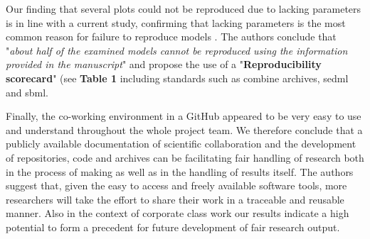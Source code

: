 Our finding that several plots could not be reproduced due to lacking parameters is in line with a current study, confirming that lacking parameters is the most common reason for failure to reproduce models \cite{tiwari2021reproducibility}. The authors conclude that "\textit{about half of the examined models cannot be reproduced using the information provided in the manuscript}" \cite{tiwari2021reproducibility} and propose the use of a "\textbf{Reproducibility scorecard}" (see \textbf{Table 1} including standards such as \ac{combine} archives, \ac{sedml} and \ac{sbml}.

Finally, the co-working environment in a GitHub appeared to be very easy to use and understand throughout the whole project team. We therefore conclude that a publicly available documentation of scientific collaboration and the development of repositories, code and archives can be facilitating \ac{fair} handling of research both in the process of making as well as in the handling of results itself.
The authors suggest that, given the easy to access and freely available software tools, more researchers will take the effort to share their work in a traceable and reusable manner. Also in the context of corporate class work our results indicate a high potential to form a precedent for future development of \ac{fair} research output.

\pagebreak

